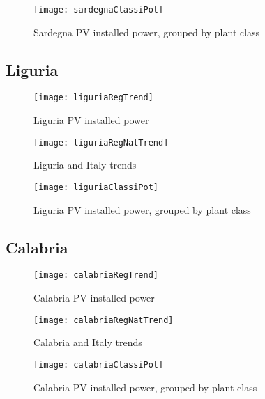 \documentclass[12pt,a4paper,openright,twoside]{report}
\begin{document}
\clearpage

\begin{figure}[hp]
	\centering
	\texttt{[image: sardegnaClassiPot]}
	\caption{Sardegna PV installed power, grouped by plant class}
	\label{sardegnaClassiPot}
\end{figure}



\subsection*{Liguria}

\begin{figure}[hp]
	\centering
	\texttt{[image: liguriaRegTrend]}
	\caption{Liguria PV installed power}
	\label{liguriaRegTrend}
\end{figure}

\begin{figure}[hp]
	\centering
	\texttt{[image: liguriaRegNatTrend]}
	\caption{Liguria and Italy trends}
	\label{liguriaRegNatTrend}
\end{figure}

\begin{figure}[hp]
	\centering
	\texttt{[image: liguriaClassiPot]}
	\caption{Liguria PV installed power, grouped by plant class}
	\label{liguriaClassiPot}
\end{figure}

\clearpage

\subsection*{Calabria}

\begin{figure}[hp]
	\centering
	\texttt{[image: calabriaRegTrend]}
	\caption{Calabria PV installed power}
	\label{calabriaRegTrend}
\end{figure}

\begin{figure}[hp]
	\centering
	\texttt{[image: calabriaRegNatTrend]}
	\caption{Calabria and Italy trends}
	\label{calabriaRegNatTrend}
\end{figure}

\clearpage

\begin{figure}[hp]
	\centering
	\texttt{[image: calabriaClassiPot]}
	\caption{Calabria PV installed power, grouped by plant class}
	\label{calabriaClassiPot}
\end{figure}
\end{document}
